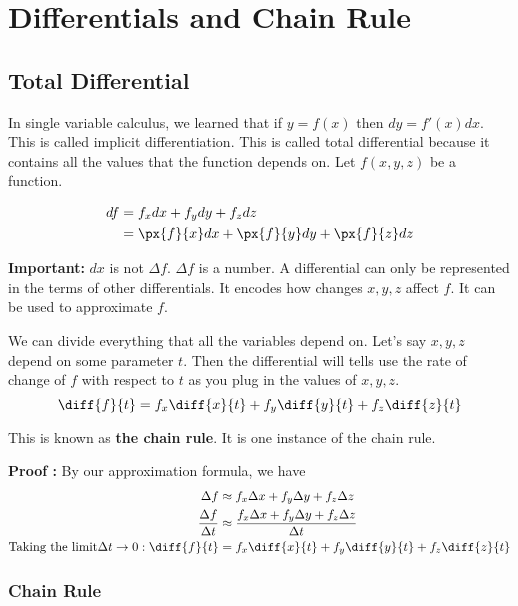 

\chapter{Differentials and Chain Rule}

\bigbreak
\section{Total Differential}

In single variable calculus, we learned that if $y = f(x)$ then $dy = f'(x)dx$. This is called implicit differentiation.
This is called total differential because it contains all the values that the function depends on.
Let $f(x, y, z)$ be a function.

\begin{align*}
    df  & = f_x dx + f_y dy + f_z dz \\
        & = \px{f}{x} dx + \px{f}{y} dy + \px{f}{z} dz
\end{align*}

{\bf Important:} $dx$ is not $\Delta f$. $\Delta f$ is a number.
A differential can only be represented in the terms of other differentials.
It encodes how changes $x, y, z$ affect $f$. It can be used to approximate $f$.

We can divide everything that all the variables depend on. 
Let's say $x, y, z$ depend on some parameter $t$. 
Then the differential will tells use the rate of change of $f$ with respect to $t$ as you plug in the values of $x, y, z$.
$$
\diff{f}{t} = f_x \diff{x}{t} + f_y \diff{y}{t} + f_z \diff{z}{t}
$$

This is known as {\bf the chain rule}. It is one instance of the chain rule.

{\bf Proof : } By our approximation formula, we have
\begin{align*}
\Delta f & \approx f_x \Delta x + f_y \Delta y + f_z \Delta z \\
\frac{\Delta f}{\Delta t} & \approx  \frac{ f_x \Delta x + f_y \Delta y + f_z \Delta z }{ \Delta t } \\
\text{Taking the limit} \Delta t \to 0 : \diff{f}{t} & = f_x \diff{x}{t} + f_y \diff{y}{t} + f_z \diff{z}{t}
\end{align*}


\subsection{Chain Rule}

